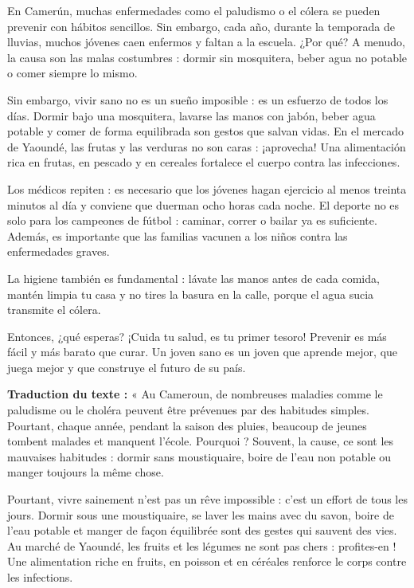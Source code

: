 \documentclass[11pt]{article}
\begin{document}
\begin{textebox}
En Camerún, muchas enfermedades como el paludismo o el cólera se pueden prevenir con hábitos sencillos. Sin embargo, cada año, durante la temporada de lluvias, muchos jóvenes caen enfermos y faltan a la escuela. ¿Por qué? A menudo, la causa son las malas costumbres : dormir sin mosquitera, beber agua no potable o comer siempre lo mismo.

Sin embargo, vivir sano no es un sueño imposible : es un esfuerzo de todos los días. Dormir bajo una mosquitera, lavarse las manos con jabón, beber agua potable y comer de forma equilibrada son gestos que salvan vidas. En el mercado de Yaoundé, las frutas y las verduras no son caras : ¡aprovecha! Una alimentación rica en frutas, en pescado y en cereales fortalece el cuerpo contra las infecciones.

Los médicos repiten : es necesario que los jóvenes hagan ejercicio al menos treinta minutos al día y conviene que duerman ocho horas cada noche. El deporte no es solo para los campeones de fútbol : caminar, correr o bailar ya es suficiente. Además, es importante que las familias vacunen a los niños contra las enfermedades graves.

La higiene también es fundamental : lávate las manos antes de cada comida, mantén limpia tu casa y no tires la basura en la calle, porque el agua sucia transmite el cólera.

Entonces, ¿qué esperas? ¡Cuida tu salud, es tu primer tesoro! Prevenir es más fácil y más barato que curar. Un joven sano es un joven que aprende mejor, que juega mejor y que construye el futuro de su país.
\end{textebox}

\textbf{Traduction du texte :} « Au Cameroun, de nombreuses maladies comme le paludisme ou le choléra peuvent être prévenues par des habitudes simples. Pourtant, chaque année, pendant la saison des pluies, beaucoup de jeunes tombent malades et manquent l'école. Pourquoi ? Souvent, la cause, ce sont les mauvaises habitudes : dormir sans moustiquaire, boire de l'eau non potable ou manger toujours la même chose.

Pourtant, vivre sainement n'est pas un rêve impossible : c'est un effort de tous les jours. Dormir sous une moustiquaire, se laver les mains avec du savon, boire de l'eau potable et manger de façon équilibrée sont des gestes qui sauvent des vies. Au marché de Yaoundé, les fruits et les légumes ne sont pas chers : profites-en ! Une alimentation riche en fruits, en poisson et en céréales renforce le corps contre les infections.
\end{document}

